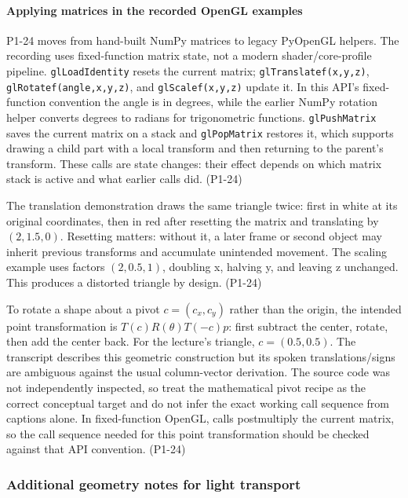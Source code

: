 \paragraph{Applying matrices in the recorded OpenGL examples}\label{applying-matrices-in-the-recorded-opengl-examples}

P1-24 moves from hand-built NumPy matrices to legacy PyOpenGL helpers. The recording uses fixed-function matrix state, not a modern shader/core-profile pipeline. \texttt{glLoadIdentity} resets the current matrix; \texttt{glTranslatef(x,y,z)}, \texttt{glRotatef(angle,x,y,z)}, and \texttt{glScalef(x,y,z)} update it. In this API's fixed-function convention the angle is in degrees, while the earlier NumPy rotation helper converts degrees to radians for trigonometric functions. \texttt{glPushMatrix} saves the current matrix on a stack and \texttt{glPopMatrix} restores it, which supports drawing a child part with a local transform and then returning to the parent's transform. These calls are state changes: their effect depends on which matrix stack is active and what earlier calls did. (P1-24)

The translation demonstration draws the same triangle twice: first in white at its original coordinates, then in red after resetting the matrix and translating by \((2,1.5,0)\). Resetting matters: without it, a later frame or second object may inherit previous transforms and accumulate unintended movement. The scaling example uses factors \((2,0.5,1)\), doubling x, halving y, and leaving z unchanged. This produces a distorted triangle by design. (P1-24)

To rotate a shape about a pivot \(c=(c_x,c_y)\) rather than the origin, the intended point transformation is \(T(c)R(\theta)T(-c)p\): first subtract the center, rotate, then add the center back. For the lecture's triangle, \(c=(0.5,0.5)\). The transcript describes this geometric construction but its spoken translations/signs are ambiguous against the usual column-vector derivation. The source code was not independently inspected, so treat the mathematical pivot recipe as the correct conceptual target and do not infer the exact working call sequence from captions alone. In fixed-function OpenGL, calls postmultiply the current matrix, so the call sequence needed for this point transformation should be checked against that API convention. (P1-24)

\subsubsection{Additional geometry notes for light transport}\label{additional-geometry-notes-for-light-transport}

